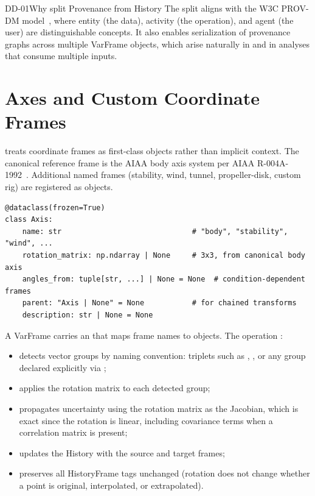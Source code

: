 \begin{ddbox}{DD-01}{Why split Provenance from History}
The split aligns \itc{} with the W3C PROV-DM model~\citep{provdm}, where
entity (the data), activity (the operation), and agent (the user) are
distinguishable concepts. It also enables serialization of provenance
graphs across multiple VarFrame objects, which arise naturally in
 and in
 analyses that consume multiple inputs.
\end{ddbox}

\section{Axes and Custom Coordinate Frames}
\label{sec:axes}

\itc{} treats coordinate frames as first-class objects rather than implicit
context. The canonical reference frame is the AIAA body axis system per
AIAA R-004A-1992~\citep{aiaaR004A}. Additional named frames (stability,
wind, tunnel, propeller-disk, custom rig) are registered as 
objects.

\begin{lstlisting}
@dataclass(frozen=True)
class Axis:
    name: str                              # "body", "stability", "wind", ...
    rotation_matrix: np.ndarray | None     # 3x3, from canonical body axis
    angles_from: tuple[str, ...] | None = None  # condition-dependent frames
    parent: "Axis | None" = None           # for chained transforms
    description: str | None = None
\end{lstlisting}

A VarFrame carries an  that maps frame names to
 objects. The operation :

\begin{itemize}[noitemsep,topsep=2pt]
  \item detects vector groups by naming convention: triplets such as
        , , or any group declared
        explicitly via ;
  \item applies the rotation matrix to each detected group;
  \item propagates uncertainty using the rotation matrix as the Jacobian,
        which is exact since the rotation is linear, including covariance
        terms when a correlation matrix is present;
  \item updates the History with the source and target frames;
  \item preserves all HistoryFrame tags unchanged (rotation does not change
        whether a point is original, interpolated, or extrapolated).
\end{itemize}

